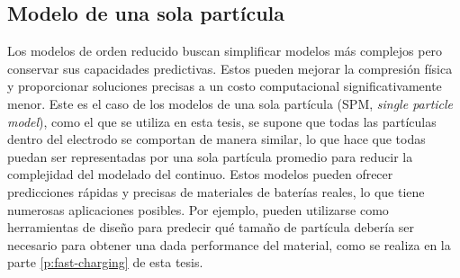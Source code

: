 \subsection{Modelo de una sola partícula}\label{s:metodologia}

Los modelos de orden reducido buscan simplificar modelos más complejos pero 
conservar sus capacidades predictivas. Estos pueden mejorar la compresión física 
y proporcionar soluciones precisas a un costo computacional significativamente menor.
Este es el caso de los modelos de una sola partícula (SPM, \textit{single particle 
model}), como el que se utiliza en esta tesis, se supone que todas las partículas
dentro del electrodo se comportan de manera similar, lo que hace que todas puedan ser 
representadas por una sola partícula promedio para reducir la complejidad del 
modelado del continuo. Estos modelos pueden ofrecer predicciones rápidas y precisas 
de materiales de baterías reales, lo que tiene numerosas aplicaciones posibles. Por ejemplo, pueden 
utilizarse como herramientas de diseño para 
predecir qué tamaño de partícula debería ser necesario para obtener una dada 
performance del material, como se realiza en la parte \ref{p:fast-charging} de 
esta tesis.


